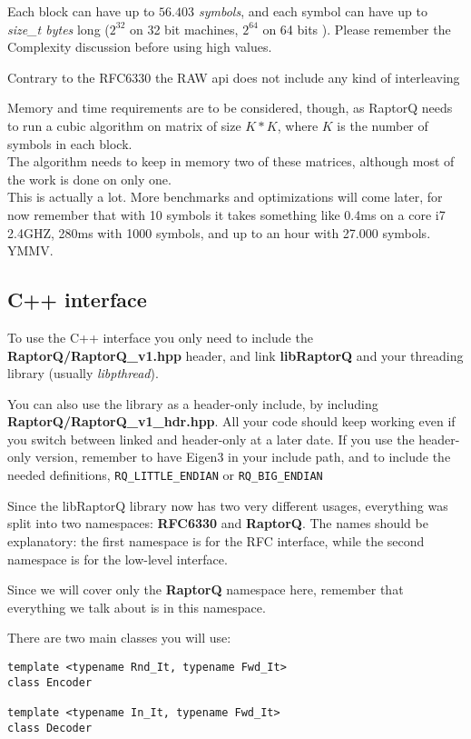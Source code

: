 \documentclass[11pt,a4paper]{refart}
\begin{document}
 Each block can have up to \textit{$56.403$ symbols}, and each
symbol can have up to \textit{size\_t bytes} long ($2^{32}$ on 32 bit machines, $2^{
	64}$ on 64 bits
). Please remember the Complexity discussion before using high values.


Contrary to the RFC6330 the RAW api does not include any kind of interleaving

Memory and time requirements are to be considered, though, as RaptorQ needs to run a cubic algorithm on matrix of size $K*K$, where $K$ is the number of symbols in each block.\\
The algorithm needs to keep in memory two of these matrices, although most of the work is done on only one.\\
This is actually a lot. More benchmarks and optimizations will come later, for now remember that with 10 symbols it takes something like 0.4ms on a core i7 2.4GHZ, 280ms with 1000 symbols, and up to an hour with 27.000 symbols. YMMV.


\subsection{C++ interface}
To use the C++ interface you only need to include the \textbf{RaptorQ/RaptorQ\_v1.hpp} header, and link \textbf{libRaptorQ} and your threading library (usually \textit{libpthread}).

You can also use the library as a header-only include, by including \textbf{RaptorQ/RaptorQ\_v1\_hdr.hpp}. All your code should keep working even if you switch between linked and header-only at a later date. If you use the header-only version, remember to have Eigen3 in your include path, and to include the needed definitions, \texttt{RQ\_LITTLE\_ENDIAN} or \texttt{RQ\_BIG\_ENDIAN}

Since the libRaptorQ library now has two very different usages, everything was split into two namespaces: \textbf{RFC6330} and \textbf{RaptorQ}. The names should be explanatory: the first namespace is for the RFC interface, while the second namespace is for the low-level interface.

Since we will cover only the \textbf{RaptorQ} namespace here, remember that everything we talk about is in this namespace.

\newpage

There are two main classes you will use:
\begin{verbatim}
template <typename Rnd_It, typename Fwd_It>
class Encoder

template <typename In_It, typename Fwd_It>
class Decoder
\end{verbatim}
\end{document}

